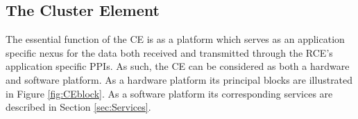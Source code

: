 


\subsection{The Cluster Element}
\label{sec:CE}
The essential function of the CE is as a platform which serves as an application specific nexus for the data both received and transmitted through the RCE's application specific PPIs. As such, the CE can be considered as both a hardware and software platform. As a hardware platform its principal blocks are illustrated in Figure \ref{fig:CEblock}. As a software platform its corresponding services are described in Section \ref{sec:Services}.


